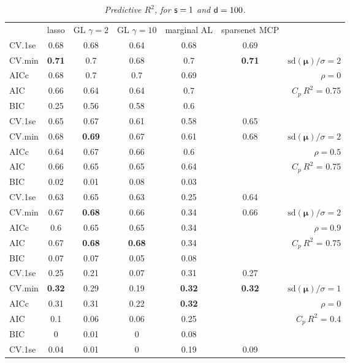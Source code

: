 \documentclass[12pt]{article}
\newcommand{\mr}[1]{\mathrm{#1}}
\newcommand{\bm}[1]{\mathbf{#1}}
\begin{document}
\begin{table}[p]\vspace{-.5cm}
\caption[l]{\label{r2}\it Predictive $R^2$, for ${\sf s}=1$ and  ${\sf d}=100$.}
\vspace{-.5cm}
\small{}
\begin{center}
\begin{tabular}{l*{5}{c}|r}
 & lasso & GL $\gamma=2$ & GL $\gamma=10$ & marginal AL & sparsenet MCP  &  \\
\cline{1-7}
CV.1se & 0.68 & 0.68 & 0.64 & 0.68 & 0.69 &\\
CV.min & {\bf 0.71} & 0.7 & 0.68 & 0.7 & {\bf 0.71} &  $\mr{sd}(\bm{\mu})/\sigma=2$ \\
AICc & 0.68 & 0.7 & 0.7 & 0.69 & & $\rho=0$ \\
AIC & 0.66 & 0.64 & 0.64 & 0.7 & & \multirow{2}{*}{$C_p ~ R^2$ = 0.75} \\
BIC & 0.25 & 0.56 & 0.58 & 0.6 & & \\
 \hline 
CV.1se & 0.65 & 0.67 & 0.61 & 0.58 & 0.65 &\\
CV.min & 0.68 & {\bf 0.69} & 0.67 & 0.61 & 0.68 &  $\mr{sd}(\bm{\mu})/\sigma=2$ \\
AICc & 0.64 & 0.67 & 0.66 & 0.6 & & $\rho=0.5$ \\
AIC & 0.66 & 0.65 & 0.65 & 0.64 & & \multirow{2}{*}{$C_p ~ R^2$ = 0.75} \\
BIC & 0.02 & 0.01 & 0.08 & 0.03 & & \\
 \hline 
CV.1se & 0.63 & 0.65 & 0.63 & 0.25 & 0.64 &\\
CV.min & 0.67 & {\bf 0.68} & 0.66 & 0.34 & 0.66 &  $\mr{sd}(\bm{\mu})/\sigma=2$ \\
AICc & 0.6 & 0.65 & 0.65 & 0.34 & & $\rho=0.9$ \\
AIC & 0.67 & {\bf 0.68} & {\bf 0.68} & 0.34 & & \multirow{2}{*}{$C_p ~ R^2$ = 0.75} \\
BIC & 0.07 & 0.07 & 0.05 & 0.08 & & \\
 \hline 
CV.1se & 0.25 & 0.21 & 0.07 & 0.31 & 0.27 &\\
CV.min & {\bf 0.32} & 0.29 & 0.19 & {\bf 0.32} & {\bf 0.32} &  $\mr{sd}(\bm{\mu})/\sigma=1$ \\
AICc & 0.31 & 0.31 & 0.22 & {\bf 0.32} & & $\rho=0$ \\
AIC & 0.1 & 0.06 & 0.06 & 0.25 & & \multirow{2}{*}{$C_p ~ R^2$ = 0.4} \\
BIC & 0 & 0.01 & 0 & 0.08 & & \\
 \hline 
CV.1se & 0.04 & 0.01 & 0 & 0.19 & 0.09 &\\

\end{tabular}
\end{center}
\end{table}
\end{document}
